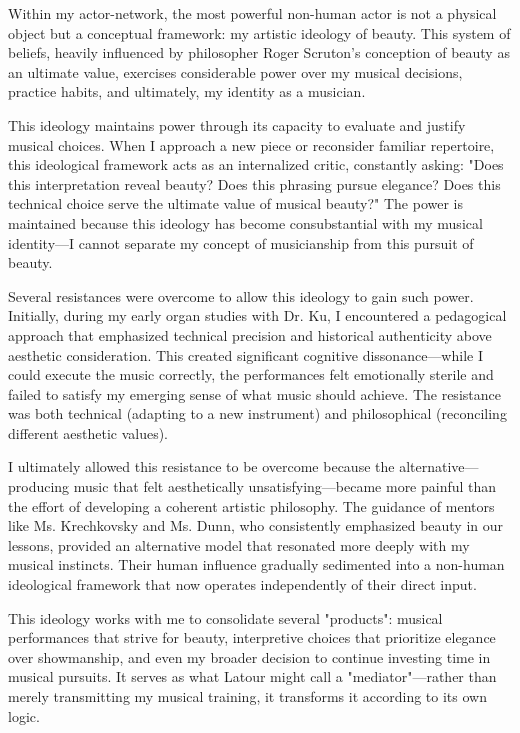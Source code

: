 \documentclass{article} %
\begin{document}
Within my actor-network, the most powerful non-human actor is not a physical object but a conceptual framework: my artistic ideology of beauty. This system of beliefs, heavily influenced by philosopher Roger Scruton's conception of beauty as an ultimate value, exercises considerable power over my musical decisions, practice habits, and ultimately, my identity as a musician.

This ideology maintains power through its capacity to evaluate and justify musical choices. When I approach a new piece or reconsider familiar repertoire, this ideological framework acts as an internalized critic, constantly asking: "Does this interpretation reveal beauty? Does this phrasing pursue elegance? Does this technical choice serve the ultimate value of musical beauty?" The power is maintained because this ideology has become consubstantial with my musical identity—I cannot separate my concept of musicianship from this pursuit of beauty.

Several resistances were overcome to allow this ideology to gain such power. Initially, during my early organ studies with Dr. Ku, I encountered a pedagogical approach that emphasized technical precision and historical authenticity above aesthetic consideration. This created significant cognitive dissonance—while I could execute the music correctly, the performances felt emotionally sterile and failed to satisfy my emerging sense of what music should achieve. The resistance was both technical (adapting to a new instrument) and philosophical (reconciling different aesthetic values).

I ultimately allowed this resistance to be overcome because the alternative—producing music that felt aesthetically unsatisfying—became more painful than the effort of developing a coherent artistic philosophy. The guidance of mentors like Ms. Krechkovsky and Ms. Dunn, who consistently emphasized beauty in our lessons, provided an alternative model that resonated more deeply with my musical instincts. Their human influence gradually sedimented into a non-human ideological framework that now operates independently of their direct input.

This ideology works with me to consolidate several "products": musical performances that strive for beauty, interpretive choices that prioritize elegance over showmanship, and even my broader decision to continue investing time in musical pursuits. It serves as what Latour might call a "mediator"—rather than merely transmitting my musical training, it transforms it according to its own logic.
\end{document}
